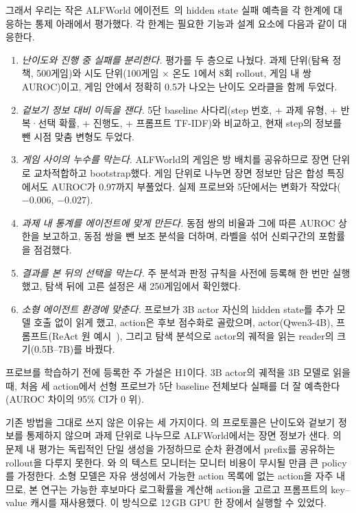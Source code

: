 \documentclass[11pt]{article}
\begin{document}
그래서 우리는 작은 ALFWorld 에이전트~\cite{shridhar2021alfworld}의 hidden state 실패 예측을 각 한계에 대응하는 통제 아래에서 평가했다. 각 한계는 필요한 기능과 설계 요소에 다음과 같이 대응한다.
\begin{enumerate}
\item \emph{난이도와 진행 중 실패를 분리한다.} 평가를 두 층으로 나눴다. 과제 단위(탐욕 정책, 500게임)와 시도 단위(100게임 $\times$ 온도 1에서 8회 rollout, 게임 내 쌍 AUROC)이고, 게임 안에서 정확히 0.5가 나오는 난이도 오라클을 함께 두었다.
\item \emph{겉보기 정보 대비 이득을 잰다.} 5단 baseline 사다리(step 번호, + 과제 유형, + 반복·선택 확률, + 진행도, + 프롬프트 TF-IDF)와 비교하고, 현재 step의 정보를 뺀 시점 맞춤 변형도 두었다.
\item \emph{게임 사이의 누수를 막는다.} ALFWorld의 게임은 방 배치를 공유하므로 장면 단위로 교차적합하고 bootstrap했다. 게임 단위로 나누면 장면 정보만 담은 합성 특징에서도 AUROC가 0.97까지 부풀었다. 실제 프로브와 5단에서는 변화가 작았다($-0.006$, $-0.027$).
\item \emph{과제 내 통계를 에이전트에 맞게 만든다.} 동점 쌍의 비율과 그에 따른 AUROC 상한을 보고하고, 동점 쌍을 뺀 보조 분석을 더하며, 라벨을 섞어 신뢰구간의 포함률을 점검했다.
\item \emph{결과를 본 뒤의 선택을 막는다.} 주 분석과 판정 규칙을 사전에 등록해 한 번만 실행했고, 탐색 뒤에 고른 설정은 새 250게임에서 확인했다.
\item \emph{소형 에이전트 환경에 맞춘다.} 프로브가 3B actor 자신의 hidden state를 추가 모델 호출 없이 읽게 했고, action은 후보 점수화로 골랐으며, actor(Qwen3-4B), 프롬프트(ReAct 원 예시~\cite{yao2023react}), 그리고 탐색 분석으로 actor의 궤적을 읽는 reader의 크기(0.5B--7B)를 바꿨다.
\end{enumerate}

프로브를 학습하기 전에 등록한 주 가설은 H1이다. 3B actor의 궤적을 3B 모델로 읽을 때, 처음 세 action에서 선형 프로브가 5단 baseline 전체보다 실패를 더 잘 예측한다(AUROC 차이의 95\% CI가 0 위).

기존 방법을 그대로 쓰지 않은 이유는 세 가지이다. \cite{ruan2026doomed}의 프로토콜은 난이도와 겉보기 정보를 통제하지 않으며 과제 단위로 나누므로 ALFWorld에서는 장면 정보가 샌다.
\cite{bulut2026problem}의 문제 내 평가는 독립적인 단일 생성을 가정하므로 순차 환경에서 prefix를 공유하는 rollout을 다루지 못한다. \cite{wang2026failfast}와 \cite{pham2026agentstop}의 텍스트 모니터는 모니터 비용이 무시될 만큼 큰 policy를 가정한다.
소형 모델은 자유 생성에서 가능한 action 목록에 없는 action을 자주 내므로, 본 연구는 가능한 후보마다 로그확률을 계산해 action을 고르고 프롬프트의 key--value 캐시를 재사용했다. 이 방식으로 12\,GB GPU 한 장에서 실행할 수 있었다.
\end{document}

